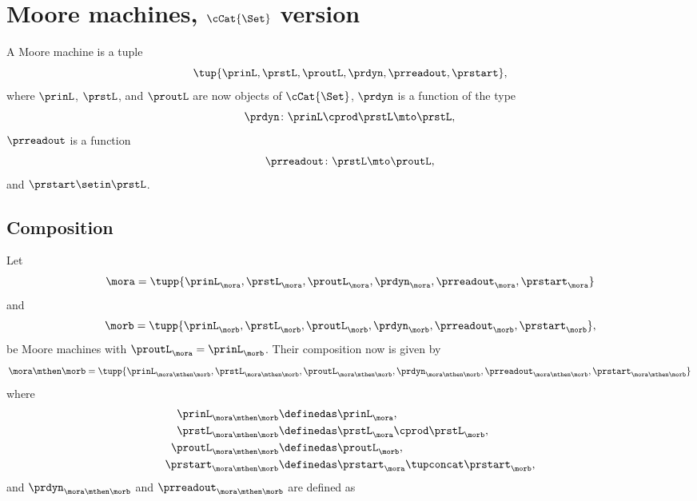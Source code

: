 
\section{Moore machines, $\cCat{\Set}$ version}

\begin{definition}
    \label{def:moore_machine_3rd}
    A Moore machine is a tuple
    \begin{equation}
        \label{eq:moore-tuple-improved-again}
        \tup{\prinL,\prstL,\proutL,\prdyn,\prreadout,\prstart},
    \end{equation}
    where $\prinL$, $\prstL$, and $\proutL$ are now objects of $\cCat{\Set}$, $\prdyn$ is a function of the type
    \begin{equation}
        \prdyn \colon \prinL \cprod \prstL \mto \prstL,
    \end{equation}
    $\prreadout$ is a function
    \begin{equation}
        \prreadout \colon \prstL \mto \proutL,
    \end{equation}
    and $\prstart \setin \prstL$.
\end{definition}

\subsection{Composition}
\label{sec:composition-of-Moore-machines}

Let
\begin{equation}
    \label{eq:moore-mora-3rd}
    \mora = \tupp{\prinL_{\mora},\prstL_{\mora},\proutL_{\mora},\prdyn_{\mora},\prreadout_{\mora},\prstart_{\mora}}
\end{equation}
%
and
%
\begin{equation}
    \label{eq:moore-morb-3rd}
    \morb = \tupp{\prinL_{\morb},\prstL_{\morb},\proutL_{\morb},\prdyn_{\morb},\prreadout_{\morb},\prstart_{\morb}},
\end{equation}
be Moore machines with $\proutL_{\mora} = \prinL_{\morb}$.
Their composition now is given by
\begin{equation}
    \mora \mthen \morb = \tupp{\prinL_{\mora \mthen \morb},\prstL_{\mora \mthen \morb},\proutL_{\mora \mthen \morb},\prdyn_{\mora \mthen \morb},\prreadout_{\mora \mthen \morb},\prstart_{\mora \mthen \morb}}
\end{equation}
where
%
\begin{equation}
    \label{eq:moore-comp-3rd-1}
    \begin{aligned}
        \prinL_{\mora\mthen\morb}   & \definedas \prinL_{\mora}, \\
        \prstL_{\mora\mthen\morb}   & \definedas \prstL_{\mora} \cprod  \prstL_{\morb}, \\
        \proutL_{\mora\mthen\morb}  & \definedas \proutL_{\morb}, \\
        \prstart_{\mora\mthen\morb} & \definedas \prstart_{\mora} \tupconcat \prstart_{\morb},
    \end{aligned}
\end{equation}
and $\prdyn_{\mora \mthen \morb}$ and $\prreadout_{\mora \mthen \morb}$ are defined as

